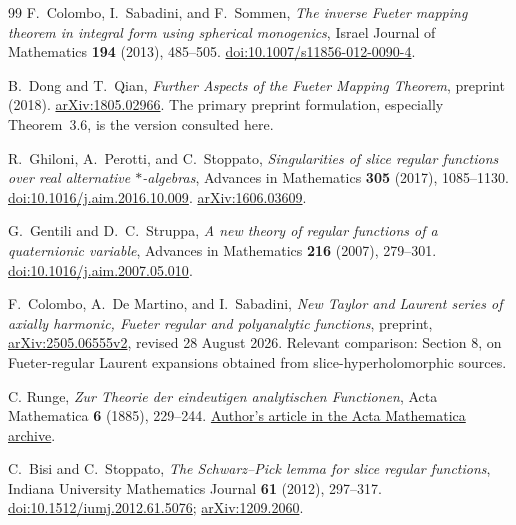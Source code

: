 \documentclass[11pt,a4paper]{article}
\numberwithin{equation}{section}
\theoremstyle{definition}
\theoremstyle{remark}
\theoremstyle{plain}
\begin{document}
\begin{thebibliography}{99}
F.~Colombo, I.~Sabadini, and F.~Sommen, \emph{The inverse Fueter mapping theorem in integral form using spherical monogenics}, Israel Journal of Mathematics \textbf{194} (2013), 485--505. \href{https://doi.org/10.1007/s11856-012-0090-4}{doi:10.1007/s11856-012-0090-4}.

B.~Dong and T.~Qian, \emph{Further Aspects of the Fueter Mapping Theorem}, preprint (2018). \href{https://arxiv.org/abs/1805.02966}{arXiv:1805.02966}. The primary preprint formulation, especially Theorem~3.6, is the version consulted here.

R.~Ghiloni, A.~Perotti, and C.~Stoppato, \emph{Singularities of slice regular functions over real alternative $*$-algebras}, Advances in Mathematics \textbf{305} (2017), 1085--1130. \href{https://doi.org/10.1016/j.aim.2016.10.009}{doi:10.1016/j.aim.2016.10.009}. \href{https://arxiv.org/abs/1606.03609}{arXiv:1606.03609}.

G.~Gentili and D.~C.~Struppa, \emph{A new theory of regular functions of a quaternionic variable}, Advances in Mathematics \textbf{216} (2007), 279--301. \href{https://doi.org/10.1016/j.aim.2007.05.010}{doi:10.1016/j.aim.2007.05.010}.

F.~Colombo, A.~De Martino, and I.~Sabadini, \emph{New Taylor and Laurent series of axially harmonic, Fueter regular and polyanalytic functions}, preprint, \href{https://arxiv.org/abs/2505.06555v2}{arXiv:2505.06555v2}, revised 28 August 2026. Relevant comparison: Section 8, on Fueter-regular Laurent expansions obtained from slice-hyperholomorphic sources.

C. Runge, \emph{Zur Theorie der eindeutigen analytischen Functionen}, Acta Mathematica \textbf{6} (1885), 229--244. \href{https://archive.ymsc.tsinghua.edu.cn/pacm_paperurl/20170108202936251283802} {Author's article in the Acta Mathematica archive}.

C.~Bisi and C.~Stoppato, \emph{The Schwarz--Pick lemma for slice regular functions}, Indiana University Mathematics Journal \textbf{61} (2012), 297--317. \href{https://doi.org/10.1512/iumj.2012.61.5076}{doi:10.1512/iumj.2012.61.5076}; \href{https://arxiv.org/abs/1209.2060}{arXiv:1209.2060}.


\end{thebibliography}
\end{document}
